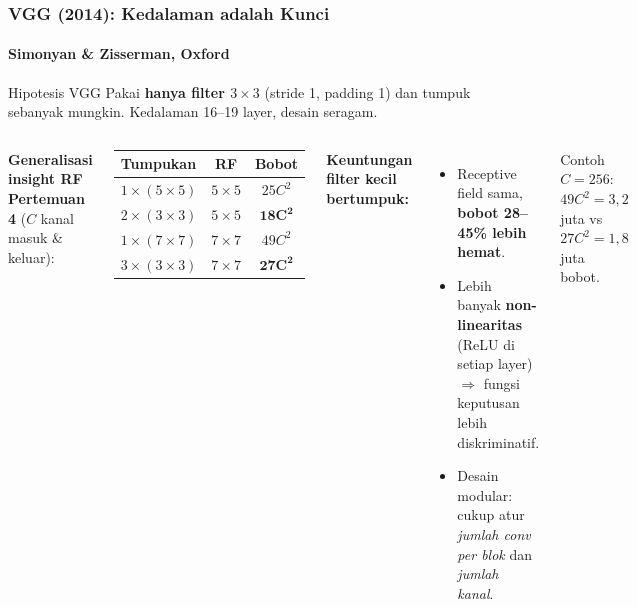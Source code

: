 \documentclass[t,aspectratio=169,xcolor=dvipsnames]{beamer}
\begin{document}
\begin{frame}
    \frametitle{VGG (2014): Kedalaman adalah Kunci}
    \framesubtitle{Simonyan \& Zisserman, Oxford}
    \footnotesize

    \begin{block}{Hipotesis VGG}
        Pakai \textbf{hanya filter $3\times3$} (stride 1, padding 1) dan tumpuk sebanyak mungkin. Kedalaman 16--19 layer, desain seragam.
    \end{block}

    \begin{columns}[T]
        \textbf{Generalisasi insight RF Pertemuan 4} ($C$ kanal masuk \& keluar):
        \begin{center}
        \begin{tabular}{lcc}
            \toprule
            \textbf{Tumpukan} & \textbf{RF} & \textbf{Bobot} \\
            \midrule
            $1\times(5\times5)$ & $5\times5$ & $25C^2$ \\
            $2\times(3\times3)$ & $5\times5$ & $\mathbf{18C^2}$ \\
            \midrule
            $1\times(7\times7)$ & $7\times7$ & $49C^2$ \\
            $3\times(3\times3)$ & $7\times7$ & $\mathbf{27C^2}$ \\
            \bottomrule
        \end{tabular}
        \end{center}

        \textbf{Keuntungan filter kecil bertumpuk:}
        \begin{itemize}
            \item Receptive field sama, \textbf{bobot 28--45\% lebih hemat}.
            \item Lebih banyak \textbf{non-linearitas} (ReLU di setiap layer) $\Rightarrow$ fungsi keputusan lebih diskriminatif.
            \item Desain modular: cukup atur \textit{jumlah conv per blok} dan \textit{jumlah kanal}.
        \end{itemize}
        \vspace{0.1cm}
        {\scriptsize\color{dlMute} Contoh $C=256$: $49C^2 = 3{,}2$ juta vs $27C^2 = 1{,}8$ juta bobot.}
    \end{columns}
\end{frame}
\end{document}
